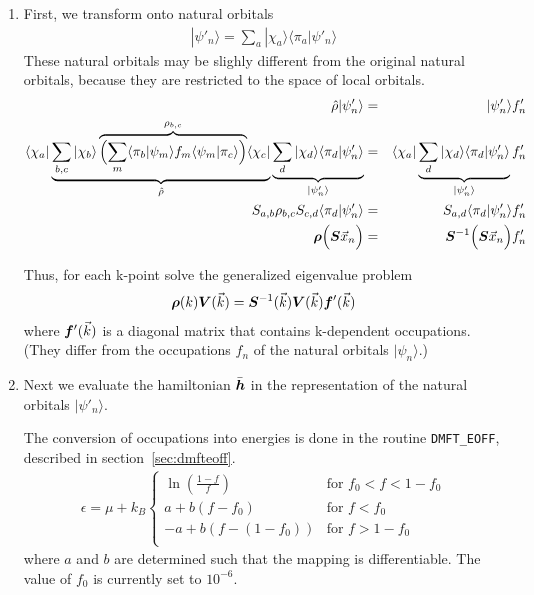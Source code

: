 \documentclass[11pt,a4paper]{report}
\begin{document}
\begin{enumerate}
  \item First, we transform onto natural orbitals 
     \begin{eqnarray}
        |\psi'_n\rangle=\sum_a|\chi_a\rangle \langle\pi_a|\psi'_n\rangle
     \end{eqnarray}
     These natural orbitals may be slighly different from the original
     natural orbitals, because they are restricted to the space of
     local orbitals.
     \begin{eqnarray}
        \hat{\rho}|\psi'_n\rangle&=&|\psi'_n\rangle f'_n
        \nonumber\\
        \langle\chi_a|
        \underbrace{\sum_{b,c}|\chi_b\rangle
        \overbrace{
           \Bigl(\sum_m\langle\pi_b|\psi_m\rangle f_m
                 \langle\psi_m|\pi_c\rangle\Bigr)}^{\rho_{b,c}}
               \langle\chi_c|}_{\hat{\rho}}
             \underbrace{\sum_d|\chi_d\rangle\langle\pi_d|\psi'_n\rangle
              }_{|\psi'_n\rangle}
             &=&
             \langle\chi_a|
             \underbrace{\sum_d|\chi_d\rangle\langle\pi_d|\psi'_n\rangle
              }_{|\psi'_n\rangle} f'_n
     \nonumber\\
           S_{a,b}\rho_{b,c}S_{c,d}\langle\pi_d|\psi'_n\rangle
           &=&S_{a,d}\langle\pi_d|\psi'_n\rangle f'_n
     \nonumber\\
           \bm{\rho} \Bigl(\bm{S} \vec{x}_n\Bigr)
           &=&\bm{S}^{-1}\Bigl(\bm{S} \vec{x}_n\Bigr) f'_n
     \end{eqnarray}

     Thus, for each k-point solve the generalized eigenvalue problem
     \begin{eqnarray*}
        \bm{\rho}(k)\bm{V}(\vec{k})=
        \bm{S}^{-1}(\vec{k})\bm{V}(\vec{k})\bm{f}'(\vec{k})
     \end{eqnarray*}
     where $\bm{f}'(\vec{k})$ is a diagonal matrix that contains
     k-dependent occupations. (They differ from the occupations $f_n$
     of the natural orbitals $|\psi_n\rangle$.)
%
\item Next we evaluate the hamiltonian $\bar{\bm{h}}$ in the
  representation of the natural orbitals $|\psi'_n\rangle$.

  The conversion of occupations into energies is done in the routine
  \verb|DMFT_EOFF|, described in section~\ref{sec:dmfteoff}.
  \begin{eqnarray}
  \epsilon=\mu+k_B
  \begin{cases}
  \ln\left(\frac{1-f}{f}\right) &\text{for $f_0<f<1-f_0$}\\
  a+b(f-f_0)&\text{for $f<f_0$}\\
  -a+b(f-(1-f_0))&\text{for $f>1-f_0$}\\
  \end{cases}
  \end{eqnarray}
  where $a$ and $b$ are determined such that the mapping is
  differentiable. The value of $f_0$ is currently set to $10^{-6}$.


\end{enumerate}
\end{document}
